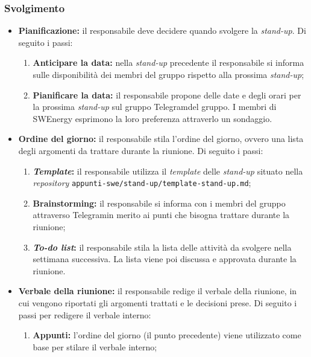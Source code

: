 \subsubsection{Svolgimento}
\begin{itemize}

	\item \textbf{Pianificazione:} il responsabile deve decidere quando
	      svolgere la \textit{stand-up}. Di seguito i passi:
	      \begin{enumerate}
		      \item \textbf{Anticipare la data:} nella \textit{stand-up}
		            precedente il responsabile si informa sulle disponibilità
		            dei membri del gruppo rispetto alla prossima
		            \textit{stand-up};

		      \item \textbf{Pianificare la data:} il responsabile propone delle
		            date e degli orari per la prossima \textit{stand-up} sul
		            gruppo Telegram\g del gruppo. I membri di SWEnergy esprimono
		            la loro preferenza attraverlo un sondaggio.
	      \end{enumerate}

	\item \textbf{Ordine del giorno:} il responsabile stila l'ordine del
	      giorno, ovvero una lista degli argomenti da trattare durante la
	      riunione. Di seguito i passi:
	      \begin{enumerate}
		      \item \textbf{\textit{Template}:} il responsabile utilizza il \textit{template}
		            delle \textit{stand-up} situato nella \textit{repository\g}
		            \texttt{appunti-swe/stand-up/template-stand-up.md};

		      \item \textbf{Brainstorming:} il responsabile si informa con i
		            membri del gruppo attraverso Telegram\g in merito ai
		            punti che bisogna trattare durante la riunione;

		      \item \textbf{\textit{To-do list}:} il responsabile stila la lista
		            delle attività da svolgere nella settimana successiva. La
		            lista viene poi discussa e approvata durante la riunione.
	      \end{enumerate}

	\item \textbf{Verbale della riunione:} il responsabile redige il
	      verbale della riunione, in cui vengono riportati gli argomenti
	      trattati e le decisioni prese. Di seguito i passi per redigere il
	      verbale interno:
	      \begin{enumerate}
		      \item \textbf{Appunti:} l'ordine del giorno (il punto precedente)
		            viene utilizzato come base per stilare il verbale interno;


\end{enumerate}
\end{itemize}
